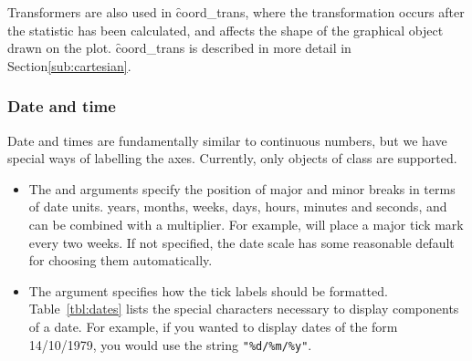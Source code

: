 % 


Transformers are also used in \f{coord_trans}, where the transformation occurs after the statistic has been calculated, and affects the shape of the graphical object drawn on the plot.  \f{coord_trans} is described in more detail in Section\ref{sub:cartesian}.


\subsubsection{Date and time}
\label{sub:scale-date}

Date and times are fundamentally similar to continuous numbers, but we have special ways of labelling the axes.  Currently, only objects of class  are supported.

\begin{itemize}
  \item The  and  arguments specify the position of major and minor breaks in terms of date units.  years, months, weeks, days, hours, minutes and seconds, and can be combined with a multiplier.  For example,  will place a major tick mark every two weeks.  If not specified, the date scale has some reasonable default for choosing them automatically.
  
  \item The  argument specifies how the tick labels should be formatted.  Table~\ref{tbl:dates} lists the special characters necessary to display components of a date.  For example, if you wanted to display dates of the form 14/10/1979, you would use the string \verb|"%d/%m/%y"|.
\end{itemize}

